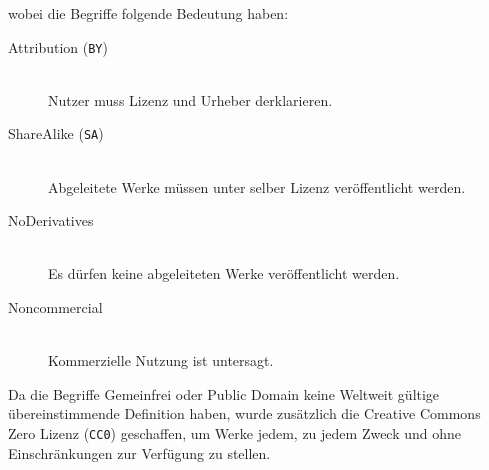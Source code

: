 wobei die Begriffe folgende Bedeutung haben:
\begin{description}
  \item[Attribution (\texttt{BY})] \mbox{} \\ Nutzer muss Lizenz und Urheber
    derklarieren.
  \item[ShareAlike (\texttt{SA})] \mbox{} \\ Abgeleitete Werke müssen unter
    selber Lizenz veröffentlicht werden.
  \item[NoDerivatives] \mbox{} \\ Es dürfen keine abgeleiteten Werke
    veröffentlicht werden.
  \item[Noncommercial] \mbox{} \\ Kommerzielle Nutzung ist untersagt.
\end{description}

Da die Begriffe Gemeinfrei oder Public Domain keine Weltweit gültige
übereinstimmende Definition haben, wurde zusätzlich die Creative Commons Zero
Lizenz (\texttt{CC0}) geschaffen, um Werke jedem, zu jedem Zweck und ohne Einschränkungen
zur Verfügung zu stellen.

